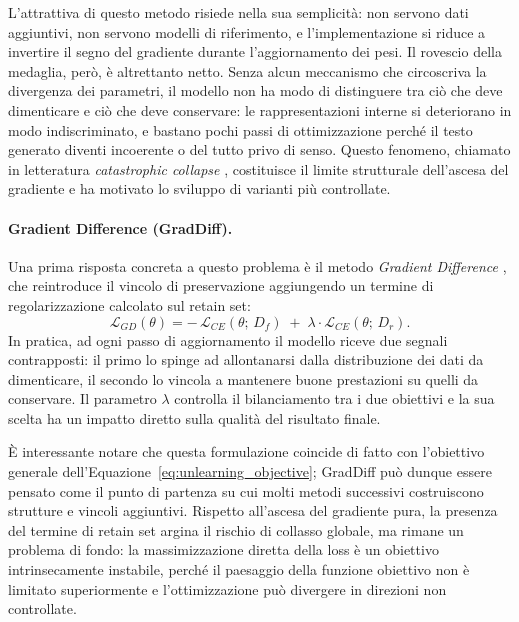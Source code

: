 L'attrattiva di questo metodo risiede nella sua semplicità: non servono dati aggiuntivi, non servono modelli di riferimento, e l'implementazione si riduce a invertire il segno del gradiente durante l'aggiornamento dei pesi. Il rovescio della medaglia, però, è altrettanto netto. Senza alcun meccanismo che circoscriva la divergenza dei parametri, il modello non ha modo di distinguere tra ciò che deve dimenticare e ciò che deve conservare: le rappresentazioni interne si deteriorano in modo indiscriminato, e bastano pochi passi di ottimizzazione perché il testo generato diventi incoerente o del tutto privo di senso. Questo fenomeno, chiamato in letteratura \emph{catastrophic collapse} \cite{zhang_negative_2024}, costituisce il limite strutturale dell'ascesa del gradiente e ha motivato lo sviluppo di varianti più controllate.

\paragraph{Gradient Difference (GradDiff).}
Una prima risposta concreta a questo problema è il metodo \emph{Gradient Difference} \cite{liu2024rethinkingmachineunlearninglarge}, che reintroduce il vincolo di preservazione aggiungendo un termine di regolarizzazione calcolato sul retain set:
\begin{equation}
    \mathcal{L}_{GD}(\theta) = -\,\mathcal{L}_{CE}(\theta;\, D_f) \;+\; \lambda \cdot \mathcal{L}_{CE}(\theta;\, D_r).
    \label{eq:grad_diff}
\end{equation}
In pratica, ad ogni passo di aggiornamento il modello riceve due segnali contrapposti: il primo lo spinge ad allontanarsi dalla distribuzione dei dati da dimenticare, il secondo lo vincola a mantenere buone prestazioni su quelli da conservare. Il parametro $\lambda$ controlla il bilanciamento tra i due obiettivi e la sua scelta ha un impatto diretto sulla qualità del risultato finale.

È interessante notare che questa formulazione coincide di fatto con l'obiettivo generale dell'Equazione~\eqref{eq:unlearning_objective}; GradDiff può dunque essere pensato come il punto di partenza su cui molti metodi successivi costruiscono strutture e vincoli aggiuntivi. Rispetto all'ascesa del gradiente pura, la presenza del termine di retain set argina il rischio di collasso globale, ma rimane un problema di fondo: la massimizzazione diretta della loss è un obiettivo intrinsecamente instabile, perché il paesaggio della funzione obiettivo non è limitato superiormente e l'ottimizzazione può divergere in direzioni non controllate.

